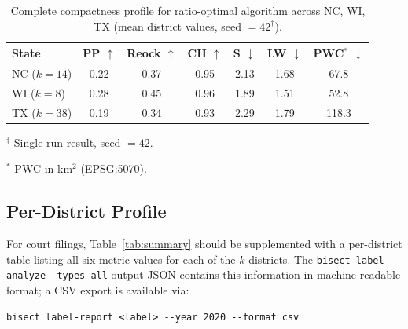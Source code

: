 \begin{table}[ht]
\centering
\caption{Complete compactness profile for ratio-optimal algorithm across
NC, WI, TX (mean district values, seed $= 42^\dagger$).}
\label{tab:cross_state}
\begin{tabular}{lcccccc}
\toprule
State & PP $\uparrow$ & Reock $\uparrow$ & CH $\uparrow$ & S $\downarrow$ & LW $\downarrow$ & PWC$^*$ $\downarrow$ \\
\midrule
NC ($k=14$) & 0.22 & 0.37 & 0.95 & 2.13 & 1.68 & 67.8 \\
WI ($k=8$)  & 0.28 & 0.45 & 0.96 & 1.89 & 1.51 & 52.8 \\
TX ($k=38$) & 0.19 & 0.34 & 0.93 & 2.29 & 1.79 & 118.3 \\
\bottomrule
\end{tabular}
\begin{tablenotes}
\footnotesize
\item $^\dagger$ Single-run result, seed $= 42$.
\item $^*$ PWC in km$^2$ (EPSG:5070).
\end{tablenotes}
\end{table}

\subsection{Per-District Profile}

For court filings, Table~\ref{tab:summary} should be supplemented with
a per-district table listing all six metric values for each of the $k$ districts.
The \texttt{bisect label-analyze --types all} output JSON contains this information
in machine-readable format; a CSV export is available via:
\begin{verbatim}
bisect label-report <label> --year 2020 --format csv
\end{verbatim}
